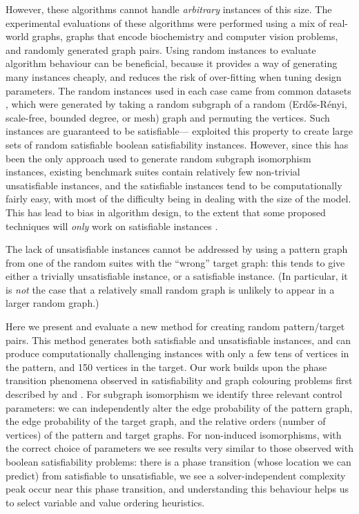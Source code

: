 \documentclass[letterpaper]{article}
\newcommand{\citet}[1]{\citeauthor{#1} \shortcite{#1}}
\newcommand{\citep}[1]{\cite{#1}}
\begin{document}
However, these algorithms cannot handle \emph{arbitrary} instances of this size. The experimental
evaluations of these algorithms were performed using a mix of real-world graphs, graphs that encode
biochemistry and computer vision problems, and randomly generated graph pairs. Using random
instances to evaluate algorithm behaviour can be beneficial, because it provides a way of generating
many instances cheaply, and reduces the risk of over-fitting when tuning design parameters. The
random instances used in each case came from common datasets \citep{DeSanto:2003,Zampelli:2010},
which were generated by taking a random subgraph of a random (Erd\H{o}s-R\'enyi, scale-free, bounded
degree, or mesh) graph and permuting the vertices. Such instances are guaranteed to be
satisfiable---\citet{Anton:2009} exploited this property to create large sets of random satisfiable
boolean satisfiability instances.  However, since this has been the only approach used to generate
random subgraph isomorphism instances, existing benchmark suites contain relatively few non-trivial
unsatisfiable instances, and the satisfiable instances tend to be computationally fairly easy, with
most of the difficulty being in dealing with the size of the model. This has lead to bias in
algorithm design, to the extent that some proposed techniques will \emph{only} work on satisfiable
instances \citep{Battiti:2007}.

The lack of unsatisfiable instances cannot be addressed by using a pattern graph from one of the
random suites with the ``wrong'' target graph: this tends to give either a trivially unsatisfiable
instance, or a satisfiable instance. (In particular, it is \emph{not} the case that a relatively
small random graph is unlikely to appear in a larger random graph.)

Here we present and evaluate a new method for creating random pattern/target pairs. This method
generates both satisfiable and unsatisfiable instances, and can produce computationally challenging
instances with only a few tens of vertices in the pattern, and 150 vertices in the target. Our work
builds upon the phase transition phenomena observed in satisfiability and graph colouring problems
first described by \citet{Cheeseman:1991} and \citet{Mitchell:1992}.  For subgraph isomorphism we
identify three relevant control parameters: we can independently alter the edge probability of the
pattern graph, the edge probability of the target graph, and the relative orders (number of
vertices) of the pattern and target graphs.  For non-induced isomorphisms, with the correct choice
of parameters we see results very similar to those observed with boolean satisfiability problems:
there is a phase transition (whose location we can predict) from satisfiable to unsatisfiable,
we see a solver-independent complexity peak occur near this phase transition, and understanding this
behaviour helps us to select variable and value ordering heuristics.
\end{document}

